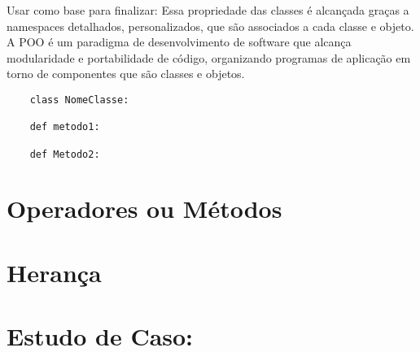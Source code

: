 	Usar como base para finalizar: 
	Essa propriedade das classes é alcançada graças a namespaces detalhados,
	personalizados, que são associados a cada classe e objeto. A POO é um paradigma de
	desenvolvimento de software que alcança modularidade e portabilidade de código, organizando
	programas de aplicação em torno de componentes que são classes e objetos.
	 
   \begin{lstlisting}
    class NomeClasse:

    def metodo1:

    def Metodo2:

    \end{lstlisting}

    \section{Operadores ou Métodos}


    \section{Herança}


    \section{Estudo de Caso: }
